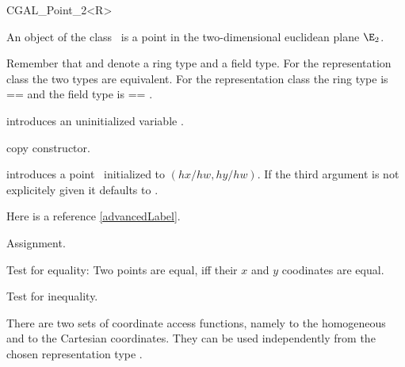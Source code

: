
\begin{ccClassTemplate} {CGAL_Point_2<R>}



\ccDefinition
An object of the class \ccClassName\ is a point in the two-dimensional
euclidean plane $\E_2$. 



Remember that  and  denote a ring type
and a field type. For the representation class
 the two types are equivalent. For the
representation class  the ring type is
 ==  and the field type is  == 
.

\ccCreation
{}


\ccHidden {}
             {introduces an uninitialized variable \ccVar.}

\ccHidden {}
            {copy constructor.}

            {introduces a point \ccVar\ initialized to $(hx/hw,hy/hw)$.
             If the third argument is not explicitely given it defaults
             to .}

Here is a reference \ref{advancedLabel}.

\ccOperations
\ccSetTwoOfThreeColumns{5cm}{4cm}

\ccHidden {}
        {Assignment.}

       {Test for equality: Two points are equal, iff their $x$ and $y$ 
        coodinates are equal.}

       {Test for inequality.}


There are two sets of coordinate access functions, namely to the
homogeneous and to the Cartesian coordinates. They can be used
independently from the chosen representation type .


\end{ccClassTemplate}
